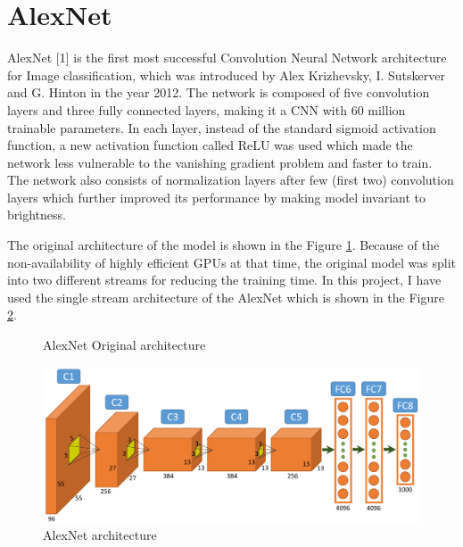 \documentclass{article} %
\begin{document}
	
	\section{AlexNet}
	AlexNet [1] is the first most successful Convolution Neural Network architecture for Image classification, which was introduced by Alex Krizhevsky, I. Sutskerver and G. Hinton in the year 2012. The network is composed of five convolution layers and three fully connected layers, making it a CNN with 60 million trainable parameters. In each layer, instead of the standard sigmoid activation function, a new activation function called ReLU was used which made the network less vulnerable to the vanishing gradient problem and faster to train. The network also consists of normalization layers after few (first two) convolution layers which further improved its performance by making model invariant to brightness. 
	
	The original architecture of the model is shown in the Figure \ref{alexnet_old}. Because of the non-availability of highly efficient GPUs at that time, the original model was split into two different streams for reducing the training time. In this project, I have used the single stream architecture of the AlexNet which is shown in the Figure \ref{alexnet_new}.
	
	\begin{figure}[h]
		\centering
		\caption{AlexNet Original architecture}
		\label{alexnet_old}
	\end{figure}

	\begin{figure}[h]
		\centering
		\includegraphics[width=12cm]{Images/alexnet_new2}
		\caption{AlexNet architecture}
		\label{alexnet_new}
	\end{figure}
\end{document}
